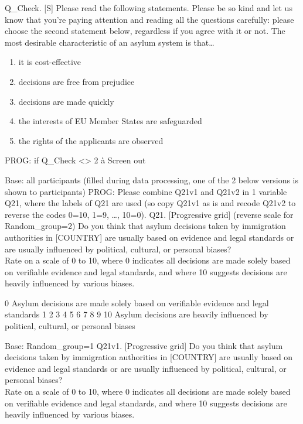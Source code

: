 \documentclass[
  12pt,
  a4paper,
]{article}
\providecommand{\tightlist}{%
  \setlength{\itemsep}{0pt}\setlength{\parskip}{0pt}}
\begin{document}
Q\_Check. {[}S{]} Please read the following statements. Please be so kind and let us know that you're paying attention and reading all the questions carefully: please choose the second statement below, regardless if you agree with it or not. The most desirable characteristic of an asylum system is that\ldots{}

\begin{enumerate}
\def\labelenumi{\arabic{enumi}.}
\tightlist
\item
  it is cost-effective\\
\item
  decisions are free from prejudice
\item
  decisions are made quickly
\item
  the interests of EU Member States are safeguarded
\item
  the rights of the applicants are observed
\end{enumerate}

PROG: if Q\_Check \textless\textgreater{} 2 à Screen out

Base: all participants (filled during data processing, one of the 2 below versions is shown to participants)
PROG: Please combine Q21v1 and Q21v2 in 1 variable Q21, where the labels of Q21 are used (so copy Q21v1 as is and recode Q21v2 to reverse the codes 0=10, 1=9, \ldots, 10=0).
Q21. {[}Progressive grid{]} (reverse scale for Random\_group=2) Do you think that asylum decisions taken by immigration authorities in {[}COUNTRY{]} are usually based on evidence and legal standards or are usually influenced by political, cultural, or personal biases?\\
Rate on a scale of 0 to 10, where 0 indicates all decisions are made solely based on verifiable evidence and legal standards, and where 10 suggests decisions are heavily influenced by various biases.

0
Asylum decisions are made solely based on verifiable evidence and legal standards 1 2 3 4 5 6 7 8 9 10
Asylum decisions are heavily influenced by political, cultural, or personal biases

Base: Random\_group=1
Q21v1. {[}Progressive grid{]} Do you think that asylum decisions taken by immigration authorities in {[}COUNTRY{]} are usually based on evidence and legal standards or are usually influenced by political, cultural, or personal biases?\\
Rate on a scale of 0 to 10, where 0 indicates all decisions are made solely based on verifiable evidence and legal standards, and where 10 suggests decisions are heavily influenced by various biases.
\end{document}
